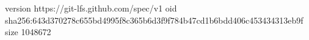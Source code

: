 version https://git-lfs.github.com/spec/v1
oid sha256:643d370278c655bd4995f8c365b6d3f9f784b47cd1b6bdd406c453434313eb9f
size 1048672
